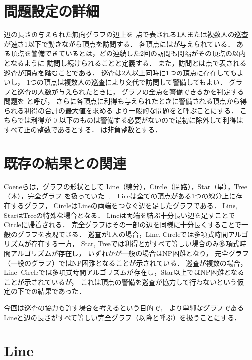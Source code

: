 \section{問題設定の詳細}
辺の長さの与えられた無向グラフの辺上を
点で表される1人または複数人の巡査が速さ1以下で動きながら頂点を訪問する．
各頂点には{\timelimit}が与えられている．
%
ある頂点を警備できているとは，どの連続した2回の訪問も間隔がその頂点の{\timelimit}以内となるように
訪問し続けられることと定義する．
また，訪問とは点で表される巡査が頂点を踏むことである．
巡査は2人以上同時に1つの頂点に存在してもよいし，
1つの頂点は複数人の巡査により交代で訪問して警備してもよい．
%
グラフと巡査の人数が与えられたときに，
グラフの全点を警備できるかを判定する問題を \decisionpp と呼び，
さらに各頂点に利得も与えられたときに警備される頂点から得られる利得の合計の最大値を求める
より一般的な問題を{\optpp}と呼ぶことにする．
こちらでは利得が $0$ 以下のものは警備する必要がないので最初に除外して利得はすべて正の整数であるとする．
{\timelimit}は非負整数とする．





\section{既存の結果との関連}
Coeneらは，グラフの形状として
Line（線分），Circle（閉路），Star（星），Tree（木），完全グラフ
を扱っていた~\cite{coene2011charlemagne}．
Lineは全ての頂点がある1つの線分上に存在するグラフ，
CircleはLineの両端をつなぐ辺を足したグラフである．
%
Line, StarはTreeの特殊な場合となる．
Lineは両端を結ぶ十分長い辺を足すことでCircleに帰着される．
完全グラフはその一部の辺を同様に十分長くすることで一般のグラフを表現できる．
%
巡査が1人の場合，Line, Circleでは多項式時間アルゴリズムが存在する一方，
Star, Treeでは利得と{\timelimit}がすべて等しい場合のみ多項式時間アルゴリズムが存在し，
いずれかが一般の場合はNP困難となり，
完全グラフ（一般のグラフ）ではNP困難となることが示されている．
%
巡査が複数の場合，
Line, Circleでは多項式時間アルゴリズムが存在し，Star以上ではNP困難となることが示されているが，
これは頂点の警備を巡査が協力して行わないという仮定の下での結果であった．
%

今回は巡査の協力も許す場合を考えるという目的で，
より単純なグラフであるLineと辺の長さがすべて等しい完全グラフ（以降{\comp}と呼ぶ）を扱うことにする．
%


\section{Line}

